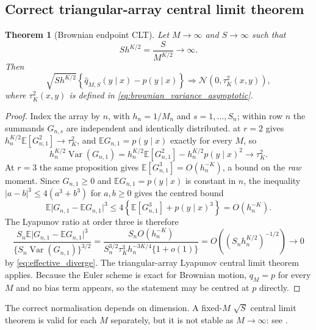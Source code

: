 \documentclass[11pt]{article}
\newtheorem{theorem}{Theorem}[section]
\theoremstyle{definition}
\newcommand{\E}{\mathbb{E}}
\newcommand{\Var}{\operatorname{Var}}
\newcommand{\Normal}{\mathcal{N}}
\begin{document}
\subsection{Correct triangular-array central limit theorem}

\begin{theorem}[Brownian endpoint CLT]\label{thm:brownian_clt}
Let $M\to\infty$ and $S\to\infty$ such that
\begin{equation}\label{eq:effective_diverge}
S h^{K/2}=\frac{S}{M^{K/2}}\longrightarrow\infty.
\end{equation}
Then
\begin{equation}\label{eq:brownian_clt}
\sqrt{S h^{K/2}}
\left\{\widehat q_{M,S}(y\mid x)-p(y\mid x)\right\}
\Longrightarrow
\Normal\!\left(0,\tau_K^2(x,y)\right),
\end{equation}
where $\tau_K^2(x,y)$ is defined in \eqref{eq:brownian_variance_asymptotic}.
\end{theorem}

\begin{proof}
Index the array by $n$, with $h_n=1/M_n$ and $s=1,\ldots,S_n$; within row $n$ the summands $G_{n,s}$ are independent and identically distributed.  at $r=2$ gives $h_n^{K/2}\E[G_{n,1}^2]\to\tau_K^2$, and $\E G_{n,1}=p(y\mid x)$ exactly for every $M$, so
\[
h_n^{K/2}\Var(G_{n,1})=h_n^{K/2}\E[G_{n,1}^2]-h_n^{K/2}p(y\mid x)^2\longrightarrow\tau_K^2 .
\]
At $r=3$ the same proposition gives $\E[G_{n,1}^3]=O(h_n^{-K})$, a bound on the \emph{raw} moment. Since $G_{n,1}\ge0$ and $\E G_{n,1}=p(y\mid x)$ is constant in $n$, the inequality $|a-b|^3\le4(a^3+b^3)$ for $a,b\ge0$ gives the centred bound
\[
\E\lvert G_{n,1}-\E G_{n,1}\rvert^3\le4\left\{\E[G_{n,1}^3]+p(y\mid x)^3\right\}=O(h_n^{-K}).
\]
The Lyapunov ratio at order three is therefore
\[
\frac{S_n\E\lvert G_{n,1}-\E G_{n,1}\rvert^3}
{\{S_n\Var(G_{n,1})\}^{3/2}}
=\frac{S_nO(h_n^{-K})}{S_n^{3/2}\tau_K^3h_n^{-3K/4}\{1+o(1)\}}
=O\!\left(\left(S_nh_n^{K/2}\right)^{-1/2}\right)\longrightarrow0
\]
by \eqref{eq:effective_diverge}. The triangular-array Lyapunov central limit theorem applies. Because the Euler scheme is exact for Brownian motion, $q_{M}=p$ for every $M$ and no bias term appears, so the statement may be centred at $p$ directly.
\end{proof}

The correct normalisation depends on dimension. A fixed-$M$ $\sqrt S$ central limit theorem is valid for each $M$ separately, but it is not stable as $M\to\infty$: see .
\end{document}

